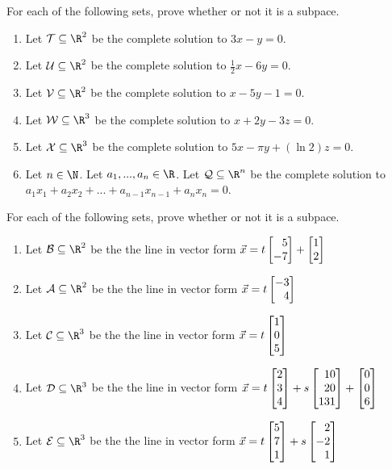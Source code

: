 \begin{exercises}
	\begin{problist}

		\prob For each of the following sets, prove whether or not it is a subpace.
		\begin{enumerate}
			\item Let $\mathcal T \subseteq \R^2$ be the complete solution to $3x-y=0$.
			\item Let $\mathcal U \subseteq \R^2$ be the complete solution to $\frac{1}{2}x-6y=0$.
			\item Let $\mathcal V \subseteq \R^2$ be the complete solution to $x-5y-1=0$.
			\item Let $\mathcal W \subseteq \R^3$ be the complete solution to $x+2y-3z=0$.
			\item Let $\mathcal X \subseteq \R^3$ be the complete solution to
			$5x-\pi y + (\ln 2)z=0$.
			\item Let $n \in \N$. Let $a_1,...,a_n \in \R$. Let $\mathcal Q \subseteq \R^n$ be the complete solution to $a_1x_1+a_2x_2+...+a_{n-1}x_{n-1}+a_nx_n=0$.
		\end{enumerate}

		\prob For each of the following sets, prove whether or not it is a subpace.
		\begin{enumerate}
			\item Let $\mathcal B \subseteq \R^2$ be the the line in vector form
			$\vec x = t\mat{5\\-7}+\mat{1\\2}$
			\item Let $\mathcal A \subseteq \R^2$ be the the line in vector form
			$\vec x = t\mat{-3\\4}$
			\item Let $\mathcal C \subseteq \R^3$ be the the line in vector form
			$\vec x = t\mat{1\\0\\5}$
			\item Let $\mathcal D \subseteq \R^3$ be the the line in vector form
			$\vec x = t\mat{2\\3\\4}+s\mat{10\\20\\131}+\mat{0\\0\\6}$
			\item Let $\mathcal E \subseteq \R^3$ be the the line in vector form
			$\vec x = t\mat{5\\7\\1}+s\mat{2\\-2\\1}$
		\end{enumerate}


\end{problist}
\end{exercises}
